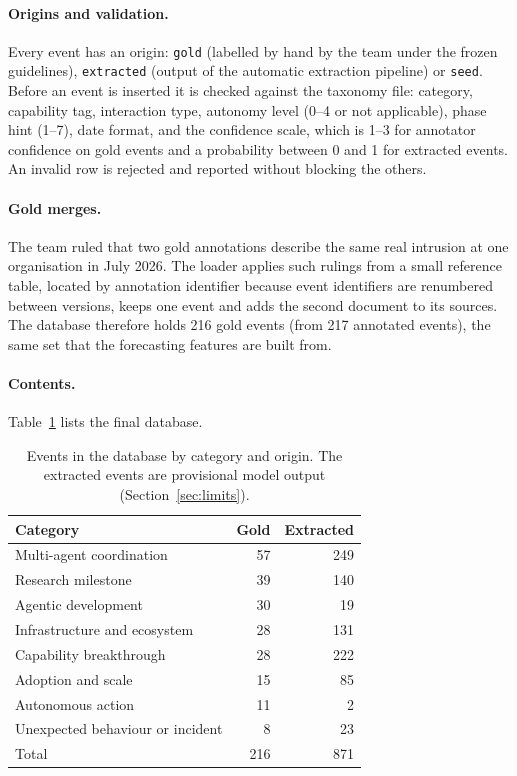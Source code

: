 \documentclass[11pt,a4paper]{article}
\newcommand{\code}[1]{\texttt{#1}}
\begin{document}
\paragraph{Origins and validation.} Every event has an origin: \code{gold} (labelled by hand by the team under
the frozen guidelines), \code{extracted} (output of the automatic extraction pipeline) or \code{seed}. Before an
event is inserted it is checked against the taxonomy file: category, capability tag, interaction type, autonomy
level (0--4 or not applicable), phase hint (1--7), date format, and the confidence scale, which is 1--3 for
annotator confidence on gold events and a probability between 0 and 1 for extracted events. An invalid row is
rejected and reported without blocking the others.

\paragraph{Gold merges.} The team ruled that two gold annotations describe the same real intrusion at one
organisation in July 2026. The loader applies such rulings from a small reference table, located by annotation
identifier because event identifiers are renumbered between versions, keeps one event and adds the second
document to its sources. The database therefore holds 216 gold events (from 217 annotated events), the same
set that the forecasting features are built from.

\paragraph{Contents.} Table~\ref{tab:events} lists the final database.

\begin{table}[ht]
\centering
\small
\begin{tabular}{@{}lrr@{}}
\toprule
Category & Gold & Extracted \\
\midrule
Multi-agent coordination & 57 & 249 \\
Research milestone & 39 & 140 \\
Agentic development & 30 & 19 \\
Infrastructure and ecosystem & 28 & 131 \\
Capability breakthrough & 28 & 222 \\
Adoption and scale & 15 & 85 \\
Autonomous action & 11 & 2 \\
Unexpected behaviour or incident & 8 & 23 \\
\midrule
Total & 216 & 871 \\
\bottomrule
\end{tabular}
\caption{Events in the database by category and origin. The extracted events are provisional model output
(Section~\ref{sec:limits}).}
\label{tab:events}
\end{table}
\end{document}
